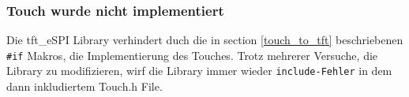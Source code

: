             \subsubsection{Touch wurde nicht implementiert}
            Die tft\_eSPI Library verhindert duch die in section \ref{touch_to_tft} 
            beschriebenen \lstinline{#if} Makros, die Implementierung des Touches.
            Trotz mehrerer Versuche, die Library zu modifizieren, wirf die Library
            immer wieder \lstinline{include-Fehler} in dem dann inkludiertem Touch.h File. \\~\\
            

            

